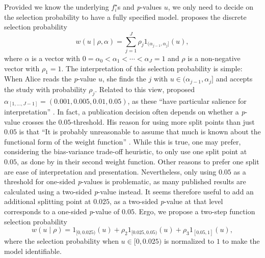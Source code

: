 \documentclass[useAMS,usenatbib,referee]{biom}
\begin{document}
Provided we know the underlying $f_{i}^{\star}$s and \textit{p}-values $u$, we only need to decide on the selection probability to have a fully specified model. \citet{hedges1992modeling} proposes the discrete selection probability
\begin{equation}
w(u\mid\rho,\alpha)=\sum_{j=1}^{J}\rho_{j}1_{(\alpha_{j-1},\alpha_{j}]}(u),\label{eq:Weighted model step function}
\end{equation}
where $\alpha$ is a vector with $0=\alpha_{0}<\alpha_{1}<\cdots<\alpha_{J}=1$ and $\rho$ is a non-negative vector with $\rho_{1}=1$. The interpretation of this selection probability is simple: When Alice reads the \textit{p}-value $u$, she finds the $j$ with $u\in(\alpha_{j-1},\alpha_{j}]$ and accepts the study with probability $\rho_{j}$. Related to this view, \citet{hedges1992modeling} proposed $\alpha_{[1,\dots,J-1]} = (0.001,0.005,0.01,0.05)$, as these \enquote{have particular salience for interpretation} \citep{hedges1992modeling}. In fact, a publication decision often depends on whether a \textit{p}-value crosses the $0.05$-threshold. His reason for using more split points than just $0.05$ is that \enquote{It is probably unreasonable to assume that much is known about the functional form of the weight function} \citep{hedges1992modeling}. While this is true, one may prefer, considering the bias-variance trade-off heuristic, to only use one split point at $0.05$, as done by \citet{iyengar1988selection} in their second weight function. Other reasons to prefer one split are ease of interpretation and presentation. Nevertheless, only using $0.05$ as a threshold for one-sided \textit{p}-values is problematic, as many published results are calculated using a two-sided \textit{p}-value instead. It seems therefore useful to add an additional splitting point at $0.025$, as a two-sided \textit{p}-value at that level corresponds to a one-sided \textit{p}-value of $0.05$. Ergo, we propose a two-step function selection probability
\[
w(u\mid\rho)=1_{[0,0.025)}(u)+\rho_{2}1_{[0.025,0.05)}(u)+\rho_{3}1_{\left[0.05,1\right]}(u),
\]
where the selection probability when $u\in[0,0.025)$ is normalized to $1$ to make the model identifiable.
\end{document}
